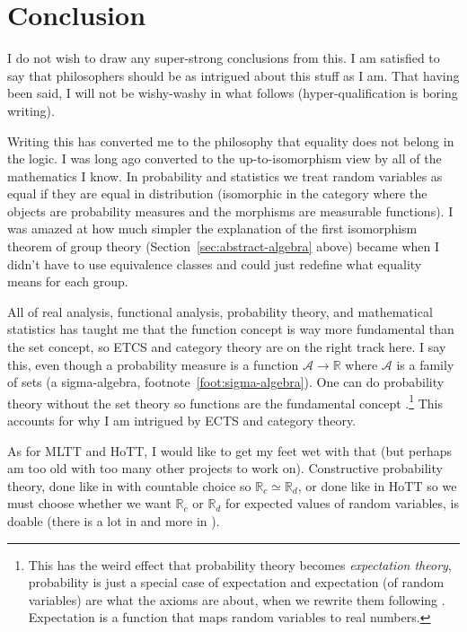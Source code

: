 \documentclass[11pt]{article}
\newcommand{\real}{\mathbb{R}}
\begin{document}
\section{Conclusion}

I do not wish to draw any super-strong conclusions from this.
I am satisfied to say that philosophers should be as intrigued about this
stuff as I am.  That having been said, I will not be wishy-washy in what
follows (hyper-qualification is boring writing).

Writing this has converted me to the philosophy that equality does not belong
in the logic.  I was long ago converted to the up-to-isomorphism view by all
of the mathematics I know.  In probability and statistics we treat random
variables as equal if they are equal in distribution (isomorphic in the
category where the objects are probability measures and the morphisms are
measurable functions).  I was amazed at how much simpler the explanation
of the first isomorphism theorem of group theory
(Section~\ref{sec:abstract-algebra} above) became when I didn't have to use
equivalence classes and could just redefine what equality means for each
group.

All of real analysis, functional analysis, probability theory, and mathematical
statistics has taught me that the function concept is way more fundamental than
the set concept, so ETCS and category theory are on the right track here.
I say this, even though a probability measure is a function
$\mathcal{A} \to \real$ where $\mathcal{A}$ is a family of sets
(a sigma-algebra, footnote~\ref{foot:sigma-algebra}).
One can do probability theory without the set theory so functions are the
fundamental concept \citep{whittle}.\footnote{This has the weird effect
that probability theory becomes \emph{expectation theory}, probability
is just a special case of expectation and expectation (of random variables)
are what the axioms are about, when we rewrite them following \citet{whittle}.
Expectation is a function that maps random variables to real numbers.}
This accounts for why I am intrigued by ECTS and category theory.

As for MLTT and HoTT, I would like to get my feet wet with that (but perhaps
am too old with too many other projects to work on).  Constructive probability
theory, done like in \citet{bishop} with countable choice
so $\real_c \simeq \real_d$, or done like in HoTT so we must choose whether
we want $\real_c$ or $\real_d$ for expected values of random variables,
is doable (there is a lot in \citet{bishop} and more
in \citet{bishop-bridges}).
\end{document}
